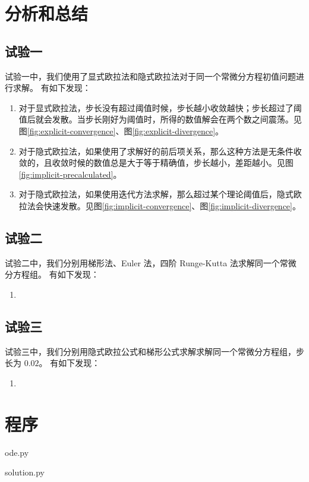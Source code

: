 \documentclass{article}
\begin{document}
\section{分析和总结}
\subsection{试验一}
试验一中，我们使用了显式欧拉法和隐式欧拉法对于同一个常微分方程初值问题进行求解。
有如下发现：
\begin{enumerate}
    \item 对于显式欧拉法，步长没有超过阈值时候，步长越小收敛越快；步长超过了阈值后就会发散。当步长刚好为阈值时，所得的数值解会在两个数之间震荡。见图\ref{fig:explicit-convergence}、图\ref{fig:explicit-divergence}。
    \item 对于隐式欧拉法，如果使用了求解好的前后项关系，那么这种方法是无条件收敛的，且收敛时候的数值总是大于等于精确值，步长越小，差距越小。见图\ref{fig:implicit-precalculated}。
    \item 对于隐式欧拉法，如果使用迭代方法求解，那么超过某个理论阈值后，隐式欧拉法会快速发散。见图\ref{fig:implicit-convergence}、图\ref{fig:implicit-divergence}。
\end{enumerate}

\subsection{试验二}
试验二中，我们分别用梯形法、Euler 法，四阶 Runge-Kutta 法求解同一个常微分方程组。
有如下发现：
\begin{enumerate}
    \item
\end{enumerate}

\subsection{试验三}
试验三中，我们分别用隐式欧拉公式和梯形公式求解求解同一个常微分方程组，步长为 $0.02$。
有如下发现：
\begin{enumerate}
    \item
\end{enumerate}

\section{程序}
ode.py


solution.py

\end{document}
